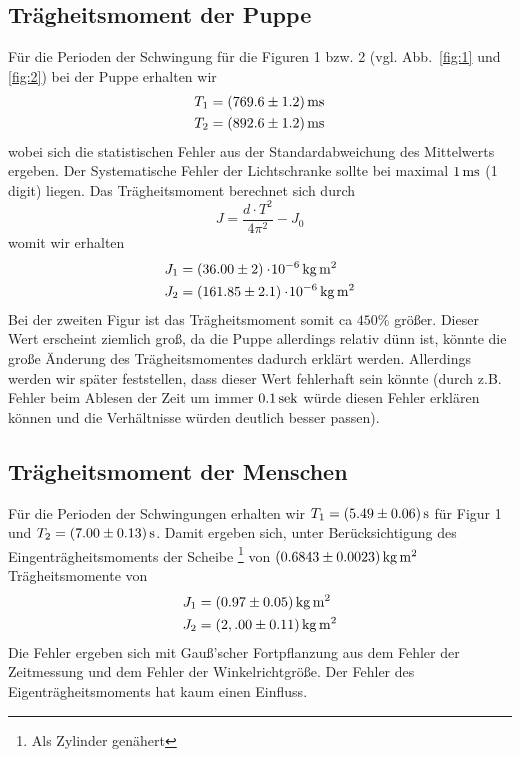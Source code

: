 \subsection{Trägheitsmoment der Puppe} \label{sec:puppe}


Für die Perioden der Schwingung für die Figuren 1 bzw. 2 (vgl. Abb.~\ref{fig:1} und \ref{fig:2}) bei der Puppe erhalten wir 
%
\begin{align*}
    T_1 &= \unit[(769.6 \pm 1.2)]{ms} \\
    T_2 &= \unit[(892.6 \pm 1.2)]{ms}
\end{align*}
%
wobei sich die statistischen Fehler aus der Standardabweichung des Mittelwerts ergeben. Der Systematische Fehler der Lichtschranke sollte bei maximal $\unit[1]{ms}$ (1 digit) liegen. Das Trägheitsmoment berechnet sich durch
\[
    J = \frac{d \cdot T^2}{4 \pi^2} - J_0
\]
womit wir erhalten
%
\begin{align*}
    J_1 &= \unit[(36.00 \pm 2) \e{-6}]{kg\,m^2} \\
    J_2 &= \unit[(161.85 \pm 2.1) \e{-6}]{kg\,m^2}
\end{align*}
%
Bei der zweiten Figur ist das Trägheitsmoment somit ca $450 \%$ größer. Dieser Wert erscheint ziemlich groß, da die Puppe allerdings relativ dünn ist, könnte die große Änderung des Trägheitsmomentes dadurch erklärt werden. Allerdings werden wir später feststellen, dass dieser Wert fehlerhaft sein könnte (durch z.B. Fehler beim Ablesen der Zeit um immer $\unit[0.1]{sek}$ würde diesen Fehler erklären können und die Verhältnisse würden deutlich besser passen).

\subsection{Trägheitsmoment der Menschen}

Für die Perioden der Schwingungen erhalten wir $T_1 = \unit[(5.49 \pm 0.06)]{s}$ für Figur 1 und $T_2 = \unit[(7.00 \pm 0.13)]{s}$. Damit ergeben sich, unter Berücksichtigung des Eingenträgheitsmoments der Scheibe%
\footnote{Als Zylinder genähert}
von $\unit[(0.6843 \pm 0.0023)]{kg\,m^2}$ Trägheitsmomente von 
%
\begin{align*}
    J_1 &= \unit[(0.97 \pm 0.05)]{kg\, m^2}\\
    J_2 &= \unit[(2,.00 \pm 0.11)]{kg\, m^2}
\end{align*}
%
Die Fehler ergeben sich mit Gauß'scher Fortpflanzung aus dem Fehler der Zeitmessung und dem Fehler der Winkelrichtgröße. Der Fehler des Eigenträgheitsmoments hat kaum einen Einfluss.







